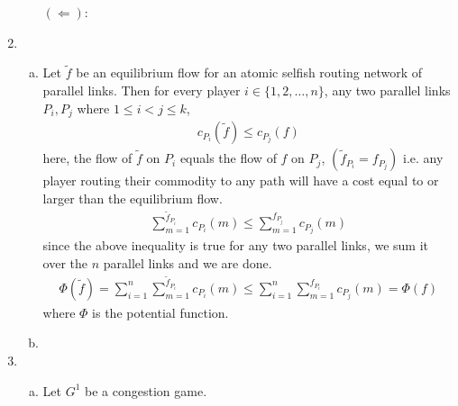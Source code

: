 \documentclass[a4paper,12pt]{article}
\theoremstyle{definition}
\begin{document}
\begin{enumerate}
\begin{enumerate}[(i)]
$(\Leftarrow)$:
\end{enumerate}

\item
\begin{enumerate}[(a)]
\item Let $\tilde{f}$ be an equilibrium flow for an atomic selfish routing network of parallel links. Then for every player $i \in \{1,2,\ldots, n\}$, any two parallel links $P_i,P_j$ where $1\leq i < j \leq k$,
\begin{align*}
c_{P_i}(\tilde{f})\leq c_{P_j}(f)
\end{align*}
here, the flow of $\tilde{f}$ on $P_i$ equals the flow of $f$ on $P_j$, $(\tilde{f}_{P_i}=f_{P_j})$ i.e. any player routing their commodity to any path will have a cost equal to or larger than the equilibrium flow.
\begin{align*}
\sum_{m=1}^{\tilde{f}_{P_i}}c_{P_i}(m)\leq \sum_{m=1}^{f_{P_j}}c_{P_j}(m)
\end{align*}
since the above inequality is true for any two parallel links, we sum it over the $n$ parallel links and we are done.
\begin{align*}
\Phi(\tilde{f})=\sum_{i=1}^{n}\sum_{m=1}^{\tilde{f}_{P_i}}c_{P_i}(m)\leq \sum_{i=1}^{n}\sum_{m=1}^{f_{P_i}}c_{P_j}(m)=\Phi(f)
\end{align*}
where $\Phi$ is the potential function.
\item
\end{enumerate}

\item
\begin{enumerate}[(a)]
\item Let $G^1$ be a congestion game.



\end{enumerate}
\end{enumerate}
\end{document}
